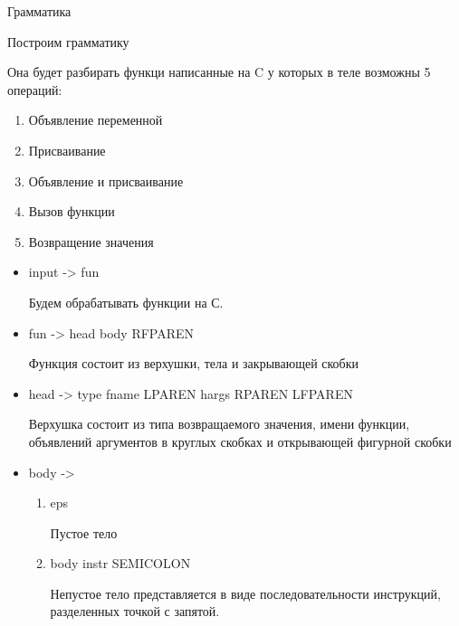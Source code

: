 \begin{para}{Грамматика}

Построим грамматику

Она будет разбирать функци написанные на C у которых в теле возможны 5 операций:

\begin{enumerate}

	\item Объявление переменной
	
	\item Присваивание
	
	\item Объявление и присваивание
	
	\item Вызов функции
	
	\item Возвращение значения

\end{enumerate}







\begin{itemize}

	\item input -> fun
	
		Будем обрабатывать функции на С.
	
	\item fun -> head body RFPAREN
	
		Функция состоит из верхушки, тела и закрывающей скобки
	
	\item head -> type fname LPAREN hargs RPAREN LFPAREN
	
		Верхушка состоит из типа возвращаемого значения, имени функции, объявлений аргументов в круглых скобках и открывающей фигурной скобки
	
	\item body ->
	
		\begin{enumerate}
			
			\item eps
			
			Пустое тело
			
			\item body instr SEMICOLON			

			Непустое тело представляется в виде последовательности инструкций, разделенных точкой с запятой.
		
		\end{enumerate}
		

\end{itemize}
\end{para}
